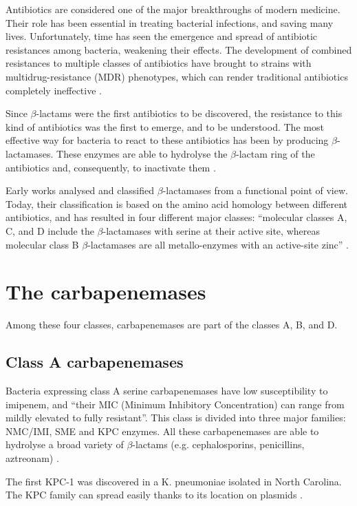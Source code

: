 \documentclass[11pt]{report}
\begin{document}
Antibiotics are considered one of the major breakthroughs of modern medicine.
Their role has been essential in treating bacterial infections, and saving many lives.
Unfortunately, time has seen the emergence and spread of antibiotic resistances among bacteria, weakening their effects.
The development of combined resistances to multiple classes of antibiotics have brought to strains with multidrug-resistance (MDR) phenotypes, which can render traditional antibiotics completely ineffective \cite{Rossolini2014}.

Since $\beta$-lactams were the first antibiotics to be discovered, the resistance to this kind of antibiotics was the first to emerge, and to be understood.
The most effective way for bacteria to react to these antibiotics has been by producing $\beta$-lactamases.
These enzymes are able to hydrolyse the $\beta$-lactam ring of the antibiotics and, consequently, to inactivate them \cite{kong2010beta}.

Early works analysed and classified $\beta$-lactamases from a functional point of view.
Today, their classification is based on the amino acid homology between different antibiotics, and has resulted in four different major classes: “molecular classes A, C, and D include the $\beta$-lactamases with serine at their active site, whereas molecular class B $\beta$-lactamases are all metallo-enzymes with an active-site zinc” \cite{Queenan2007}.

\section{The carbapenemases}
Among these four classes, carbapenemases are part of the classes A, B, and D.

\subsection{Class A carbapenemases}
Bacteria expressing class A serine carbapenemases have low susceptibility to imipenem, and “their MIC (Minimum Inhibitory Concentration) can range from mildly elevated to fully resistant”.
This class is divided into three major families: NMC/IMI, SME and KPC enzymes.
All these carbapenemases are able to hydrolyse a broad variety of $\beta$-lactams (e.g. cephalosporins, penicillins, aztreonam) \cite{kong2010beta} \cite{Queenan2007}.

The first KPC-1 was discovered in a K. pneumoniae isolated in North Carolina.
The KPC family can spread easily thanks to its location on plasmids \cite{Queenan2007}.
\end{document}
